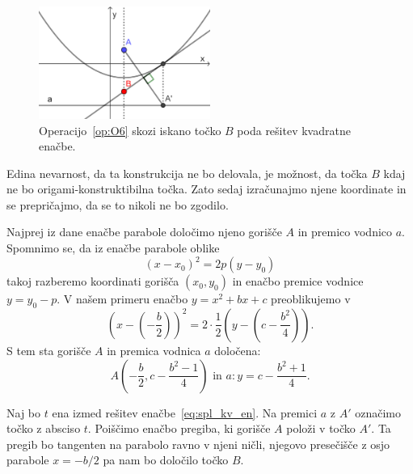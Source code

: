 \begin{figure}[h]
    \centering
    \includegraphics[width=0.5\textwidth]{images/kvadratna_enacba/tockaB_in_O6.png}
    \caption[Iskanje točke $B$]{Operacijo~\ref{op:O6} skozi iskano točko $B$ poda rešitev kvadratne enačbe.}
    \label{fig:tockaB_in_O6}
\end{figure}

Edina nevarnost, da ta konstrukcija ne bo delovala, je možnost, da točka $B$ kdaj ne bo origami-konstruktibilna točka. Zato sedaj izračunajmo njene koordinate in se prepričajmo, da se to nikoli ne bo zgodilo.

Najprej iz dane enačbe parabole določimo njeno gorišče $A$ in premico vodnico $a$. Spomnimo se, da iz enačbe parabole oblike
$$ (x - x_0)^2 = 2p(y - y_0) $$
takoj razberemo koordinati gorišča $(x_0, y_0)$ in enačbo premice vodnice $y = y_0 - p$. V našem primeru enačbo $y = x^2 + bx + c$ preoblikujemo v
$$ \left(x-\left(-\frac{b}{2}\right)\right)^2 = 2 \cdot \frac{1}{2} \left(y - \left(c - \frac{b^2}{4}\right)\right). $$
S tem sta gorišče $A$ in premica vodnica $a$ določena:
$$ A\left(-\frac{b}{2}, c - \frac{b^2 - 1}{4}\right) \text{ in } a: y = c - \frac{b^2 + 1}{4}. $$

Naj bo $t$ ena izmed rešitev enačbe~\ref{eq:spl_kv_en}. Na premici $a$ z $A'$ označimo točko z absciso $t$. Poiščimo enačbo pregiba, ki gorišče $A$ položi v točko $A'$. Ta pregib bo tangenten na parabolo ravno v njeni ničli, njegovo presečišče z osjo parabole $ x = -b/2 $ pa nam bo določilo točko $B$.

